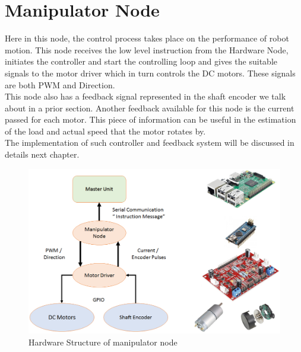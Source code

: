 \documentclass[12pt]{book}
\begin{document}
\section{Manipulator Node}
	Here in this node, the control process takes place on the performance of robot motion. This node receives the low level instruction from the Hardware Node, initiates the controller and start the controlling loop and gives the suitable signals to the motor driver which in turn controls the DC motors. These signals are both PWM and Direction. \\
	This node also has a feedback signal represented in the shaft encoder we talk about in a prior section. Another feedback available for this node is the current passed for each motor. This piece of information can be useful in the estimation of the load and actual speed that the motor rotates by.\\
	The implementation of such controller and feedback system will be discussed in details next chapter.
	\begin{figure}
		\centering
		\includegraphics[width =1\textwidth]{Fig/manipulator-node.png}
		\caption{Hardware Structure of manipulator node}
		\label{fig:manipulator-node}
	\end{figure}
\end{document}
